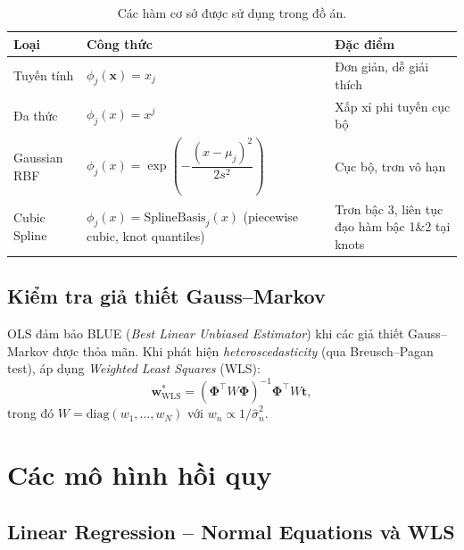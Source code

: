 \documentclass[12pt, a4paper]{article}
\begin{document}
\begin{table}[H]
  \centering
  \caption{Các hàm cơ sở được sử dụng trong đồ án.}
  \label{tab:basis_functions}
  \begin{tabular}{lll}
    \toprule
    \textbf{Loại} & \textbf{Công thức} & \textbf{Đặc điểm} \\
    \midrule
    Tuyến tính    & $\phi_j(\mathbf{x}) = x_j$
                  & Đơn giản, dễ giải thích \\
    Đa thức       & $\phi_j(x) = x^j$
                  & Xấp xỉ phi tuyến cục bộ \\
    Gaussian RBF  & $\phi_j(x) = \exp\!\left(-\dfrac{(x-\mu_j)^2}{2s^2}\right)$
                  & Cục bộ, trơn vô hạn \\
    Cubic Spline
      & $\phi_j(x) = \text{SplineBasis}_j(x)$ (piecewise cubic, knot quantiles)
      & Trơn bậc 3, liên tục đạo hàm bậc 1\&2 tại knots \\
    \bottomrule
  \end{tabular}
\end{table}

\subsection{Kiểm tra giả thiết Gauss--Markov}

OLS đảm bảo BLUE (\emph{Best Linear Unbiased Estimator}) khi các giả thiết
Gauss--Markov được thỏa mãn. Khi phát hiện \emph{heteroscedasticity}
(qua Breusch--Pagan test), áp dụng \emph{Weighted Least Squares} (WLS):
\begin{equation}
  \mathbf{w}^*_{\text{WLS}} = (\boldsymbol{\Phi}^\top W \boldsymbol{\Phi})^{-1}
                                \boldsymbol{\Phi}^\top W \mathbf{t},
  \label{eq:wls}
\end{equation}
trong đó $W = \text{diag}(w_1, \dots, w_N)$ với $w_n \propto 1/\hat{\sigma}^2_n$.

\section{Các mô hình hồi quy}
\label{sec:models}

\subsection{Linear Regression -- Normal Equations và WLS}
\label{ssec:lr_ne}
\end{document}
